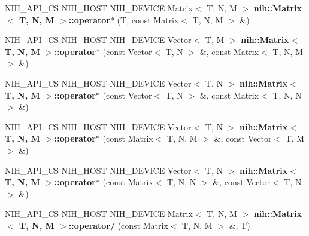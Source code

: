 \begin{DoxyCompactItemize}
\item 
\hypertarget{group__linalg_ga420f26f0c8944b7baf09ae4e35e532cb}{
\-N\-I\-H\-\_\-\-A\-P\-I\-\_\-\-C\-S \-N\-I\-H\-\_\-\-H\-O\-S\-T \-N\-I\-H\-\_\-\-D\-E\-V\-I\-C\-E \*
\-Matrix$<$ \-T, \-N, \-M $>$ {\bfseries nih\-::\-Matrix$<$ T, N, M $>$\-::operator$\ast$} (\-T, const \-Matrix$<$ \-T, \-N, \-M $>$ \&)}
\label{group__linalg_ga420f26f0c8944b7baf09ae4e35e532cb}

\item 
\hypertarget{group__linalg_ga75d351600704ea2bc1ac3bc7e957f23e}{
\-N\-I\-H\-\_\-\-A\-P\-I\-\_\-\-C\-S \-N\-I\-H\-\_\-\-H\-O\-S\-T \-N\-I\-H\-\_\-\-D\-E\-V\-I\-C\-E \*
\-Vector$<$ \-T, \-M $>$ {\bfseries nih\-::\-Matrix$<$ T, N, M $>$\-::operator$\ast$} (const \-Vector$<$ \-T, \-N $>$ \&, const \-Matrix$<$ \-T, \-N, \-M $>$ \&)}
\label{group__linalg_ga75d351600704ea2bc1ac3bc7e957f23e}

\item 
\hypertarget{group__linalg_ga2080215f8cfbc3d8e28117203bd3f64a}{
\-N\-I\-H\-\_\-\-A\-P\-I\-\_\-\-C\-S \-N\-I\-H\-\_\-\-H\-O\-S\-T \-N\-I\-H\-\_\-\-D\-E\-V\-I\-C\-E \*
\-Vector$<$ \-T, \-N $>$ {\bfseries nih\-::\-Matrix$<$ T, N, M $>$\-::operator$\ast$} (const \-Vector$<$ \-T, \-N $>$ \&, const \-Matrix$<$ \-T, \-N, \-N $>$ \&)}
\label{group__linalg_ga2080215f8cfbc3d8e28117203bd3f64a}

\item 
\hypertarget{group__linalg_ga90e49771ff8faf34b8affca8fb924030}{
\-N\-I\-H\-\_\-\-A\-P\-I\-\_\-\-C\-S \-N\-I\-H\-\_\-\-H\-O\-S\-T \-N\-I\-H\-\_\-\-D\-E\-V\-I\-C\-E \*
\-Vector$<$ \-T, \-N $>$ {\bfseries nih\-::\-Matrix$<$ T, N, M $>$\-::operator$\ast$} (const \-Matrix$<$ \-T, \-N, \-M $>$ \&, const \-Vector$<$ \-T, \-M $>$ \&)}
\label{group__linalg_ga90e49771ff8faf34b8affca8fb924030}

\item 
\hypertarget{group__linalg_ga02179c82f9486c57d27e245c57a87e53}{
\-N\-I\-H\-\_\-\-A\-P\-I\-\_\-\-C\-S \-N\-I\-H\-\_\-\-H\-O\-S\-T \-N\-I\-H\-\_\-\-D\-E\-V\-I\-C\-E \*
\-Vector$<$ \-T, \-N $>$ {\bfseries nih\-::\-Matrix$<$ T, N, M $>$\-::operator$\ast$} (const \-Matrix$<$ \-T, \-N, \-N $>$ \&, const \-Vector$<$ \-T, \-N $>$ \&)}
\label{group__linalg_ga02179c82f9486c57d27e245c57a87e53}

\item 
\hypertarget{group__linalg_ga24d2f0d22492f9e3d3807af392e5fd12}{
\-N\-I\-H\-\_\-\-A\-P\-I\-\_\-\-C\-S \-N\-I\-H\-\_\-\-H\-O\-S\-T \-N\-I\-H\-\_\-\-D\-E\-V\-I\-C\-E \*
\-Matrix$<$ \-T, \-N, \-M $>$ {\bfseries nih\-::\-Matrix$<$ T, N, M $>$\-::operator/} (const \-Matrix$<$ \-T, \-N, \-M $>$ \&, \-T)}
\label{group__linalg_ga24d2f0d22492f9e3d3807af392e5fd12}

\end{DoxyCompactItemize}
